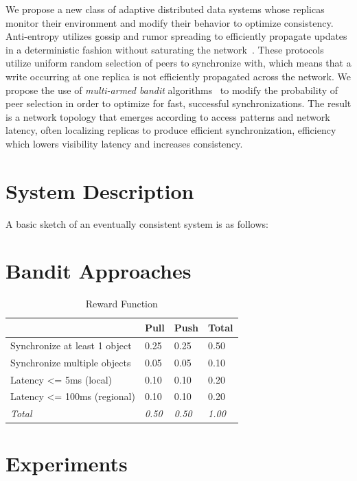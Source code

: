 We propose a new class of adaptive distributed data systems whose replicas
monitor their environment and modify their behavior to optimize consistency.
Anti-entropy utilizes gossip and rumor spreading to efficiently propagate
updates in a deterministic fashion without saturating the
network~\cite{haeupler_simple_2015,karp_randomized_2000,moreno_dynamics_2004}.
These protocols utilize uniform random selection of peers to synchronize
with, which means that a write occurring at one replica is not efficiently
propagated across the network.
We propose the use of \textit{multi-armed bandit}
algorithms~\cite{langford_epoch-greedy_2008,luo_efficient_2017} to modify the
probability of peer selection in order to optimize for fast, successful
synchronizations.
The result is a network topology that emerges according to access patterns
and network latency, often localizing replicas to produce efficient
synchronization, efficiency which lowers visibility latency and increases
consistency.

\section*{System Description}

A basic sketch of an eventually consistent system is as follows:

\section*{Bandit Approaches}

\begin{table}[]
\centering
\begin{tabular}{@{}|l|l|l|l|@{}}
\toprule
 & \textbf{Pull} & \textbf{Push} & \textbf{Total} \\ \midrule
Synchronize at least 1 object & 0.25 & 0.25 & 0.50 \\ \midrule
Synchronize multiple objects & 0.05 & 0.05 & 0.10 \\ \midrule
Latency <= 5ms (local) & 0.10 & 0.10 & 0.20 \\ \midrule
Latency <= 100ms (regional) & 0.10 & 0.10 & 0.20 \\ \midrule
\textit{Total} & \textit{0.50} & \textit{0.50} & \textit{1.00} \\ \bottomrule
\end{tabular}
\caption{Reward Function}
\label{tab:rewards}
\end{table}

\section*{Experiments}

